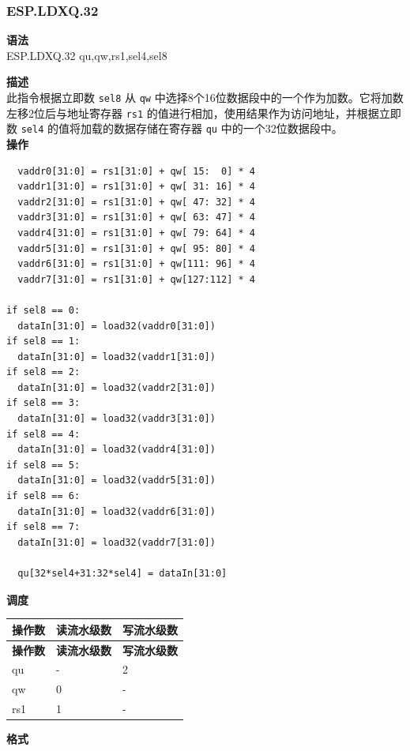 \newpage
\subsubsection{ESP.LDXQ.32}\label{instruction:ESPLDXQ32}
\textbf{语法}\\
ESP.LDXQ.32 qu,qw,rs1,sel4,sel8

\textbf{描述}\\
此指令根据立即数 \lstinline{sel8} 从 \lstinline{qw} 中选择8个16位数据段中的一个作为加数。它将加数左移2位后与地址寄存器 \lstinline{rs1} 的值进行相加，使用结果作为访问地址，并根据立即数 \lstinline{sel4} 的值将加载的数据存储在寄存器 \lstinline{qu} 中的一个32位数据段中。\\
\textbf{操作}
\begin{lstlisting}
  vaddr0[31:0] = rs1[31:0] + qw[ 15:  0] * 4
  vaddr1[31:0] = rs1[31:0] + qw[ 31: 16] * 4
  vaddr2[31:0] = rs1[31:0] + qw[ 47: 32] * 4
  vaddr3[31:0] = rs1[31:0] + qw[ 63: 47] * 4
  vaddr4[31:0] = rs1[31:0] + qw[ 79: 64] * 4
  vaddr5[31:0] = rs1[31:0] + qw[ 95: 80] * 4
  vaddr6[31:0] = rs1[31:0] + qw[111: 96] * 4
  vaddr7[31:0] = rs1[31:0] + qw[127:112] * 4

if sel8 == 0:
  dataIn[31:0] = load32(vaddr0[31:0])
if sel8 == 1:
  dataIn[31:0] = load32(vaddr1[31:0])
if sel8 == 2:
  dataIn[31:0] = load32(vaddr2[31:0])
if sel8 == 3:
  dataIn[31:0] = load32(vaddr3[31:0])
if sel8 == 4:
  dataIn[31:0] = load32(vaddr4[31:0])
if sel8 == 5:
  dataIn[31:0] = load32(vaddr5[31:0])
if sel8 == 6:
  dataIn[31:0] = load32(vaddr6[31:0])
if sel8 == 7:
  dataIn[31:0] = load32(vaddr7[31:0])

  qu[32*sel4+31:32*sel4] = dataIn[31:0]
\end{lstlisting}

\textbf{调度}\\
\begin{longtable}[c]{|l|l|l|}
    \hline
    \rowcolor{lightgray}
    \textbf{操作数} & \textbf{读流水级数} & \textbf{写流水级数} \\\hline
    \endfirsthead
    \hline
    \rowcolor{lightgray}
     \textbf{操作数} & \textbf{读流水级数} & \textbf{写流水级数} \\\hline
    \endhead
    \hline
    \endfoot

  qu & - & 2 \\\hline
  qw & 0 & - \\\hline
  rs1 & 1 & -

\end{longtable}

\textbf{格式}\\

